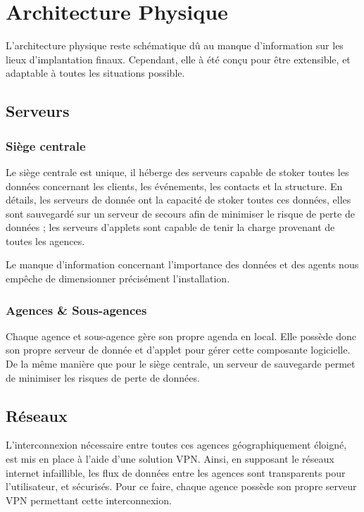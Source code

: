 \section{Architecture Physique}

    L'architecture physique reste schématique dû au manque d'information sur les lieux d'implantation finaux.
    Cependant, elle à été conçu pour être extensible, et adaptable à toutes les situations possible.

    \subsection{Serveurs}
        
        \subsubsection{Siège centrale}
        
            Le siège centrale est unique, il héberge des serveurs capable de stoker toutes les données concernant les clients, les événements, les contacts et la structure.
            En détails, les serveurs de donnée ont la capacité de stoker toutes ces données, elles sont sauvegardé sur un serveur de secours afin de minimiser le risque de perte de données ; les serveurs d'applets sont capable de tenir la charge provenant de toutes les agences.
            
            Le manque d'information concernant l'importance des données et des agents nous empêche de dimensionner précisément l'installation.
        
        \subsubsection{Agences & Sous-agences}
        
            Chaque agence et sous-agence gère son propre agenda en local. Elle possède donc son propre serveur de donnée et d'applet pour gérer cette composante logicielle. De la même manière que pour le siège centrale, un serveur de sauvegarde permet de minimiser les risques de perte de données.            
    
    \subsection{Réseaux}
    
        L'interconnexion nécessaire entre toutes ces agences géographiquement éloigné, est mis en place à l'aide d'une solution VPN.
        Ainsi, en supposant le réseaux internet infaillible, les flux de données entre les agences sont transparents pour l'utilisateur, et sécurisés.
        Pour ce faire, chaque agence possède son propre serveur VPN permettant cette interconnexion.

